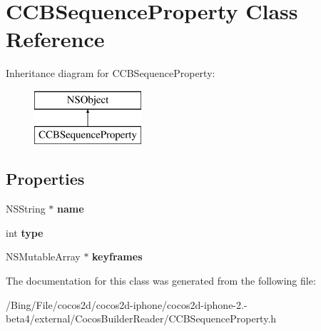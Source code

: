 \hypertarget{interface_c_c_b_sequence_property}{\section{C\-C\-B\-Sequence\-Property Class Reference}
\label{interface_c_c_b_sequence_property}
}
Inheritance diagram for C\-C\-B\-Sequence\-Property\-:\begin{figure}[H]
\begin{center}
\leavevmode
\includegraphics[height=2.000000cm]{interface_c_c_b_sequence_property}
\end{center}
\end{figure}
\subsection*{Properties}
\begin{DoxyCompactItemize}
\item 
\hypertarget{interface_c_c_b_sequence_property_ae93be70bf9aa5331138939af3ecc6886}{N\-S\-String $\ast$ {\bfseries name}}\label{interface_c_c_b_sequence_property_ae93be70bf9aa5331138939af3ecc6886}

\item 
\hypertarget{interface_c_c_b_sequence_property_a5831c2fe7310ac32fe62e3dcd7ab6ac9}{int {\bfseries type}}\label{interface_c_c_b_sequence_property_a5831c2fe7310ac32fe62e3dcd7ab6ac9}

\item 
\hypertarget{interface_c_c_b_sequence_property_ac3aa2c2008c993b102ce12ad198d9966}{N\-S\-Mutable\-Array $\ast$ {\bfseries keyframes}}\label{interface_c_c_b_sequence_property_ac3aa2c2008c993b102ce12ad198d9966}

\end{DoxyCompactItemize}


The documentation for this class was generated from the following file\-:\begin{DoxyCompactItemize}
\item 
/\-Bing/\-File/cocos2d/cocos2d-\/iphone/cocos2d-\/iphone-\/2.-\/beta4/external/\-Cocos\-Builder\-Reader/C\-C\-B\-Sequence\-Property.\-h\end{DoxyCompactItemize}
